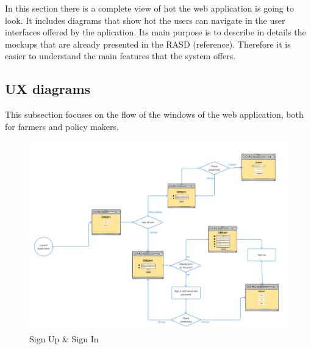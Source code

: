 In this section there is a complete view of hot the web application is going to look. 
It includes diagrams that show hot the users can navigate in the user interfaces offered by the aplication.
Its main purpose is to describe in details the mockups that are already presented in the RASD (reference). Therefore it is easier to understand 
the main features that the system offers.


\subsection{UX diagrams}
This subsection focuses on the flow of the windows of the web application, 
both for farmers and policy makers.

\begin{figure}[H]
    \begin{center}
          \includegraphics[width=1\textwidth]{images/UXdiagram_login.png}
          \caption{Sign Up \& Sign In}
    \end{center}
\end{figure}

